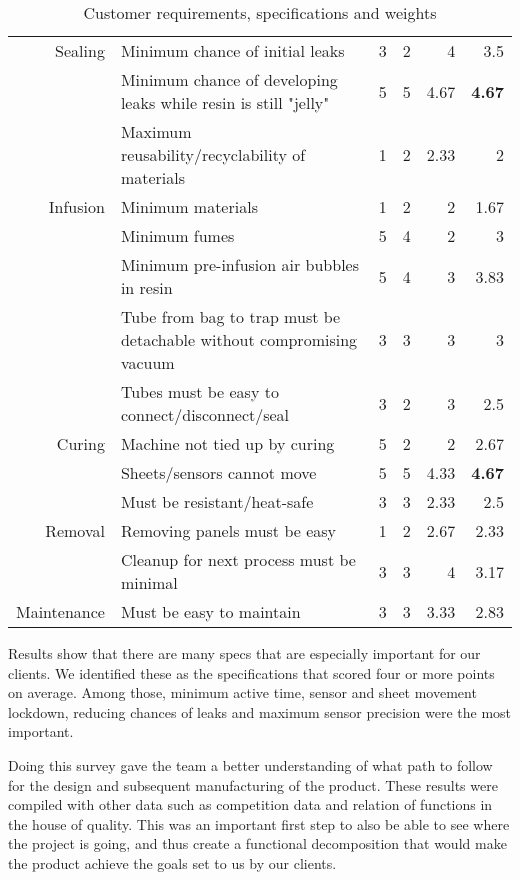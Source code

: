 \documentclass[12pt,letterpaper,notitlepage]{article}
\begin{document}
\begin{table}[H]
\begin{tabular}{rL{5cm}rrr|r}
\hline
    Sealing & Minimum chance of initial leaks & 3     & 2     & 4     & 3.5 \\
          & Minimum chance of developing leaks while resin is still "jelly" & 5     & 5     & 4.67  & \textbf{4.67} \\
          & Maximum reusability/recyclability of materials & 1     & 2     & 2.33  & 2 \\
\hline
    Infusion & Minimum materials & 1     & 2     & 2     & 1.67 \\
          & Minimum fumes & 5     & 4     & 2     & 3 \\
          & Minimum pre-infusion air bubbles in resin & 5     & 4     & 3     & 3.83 \\
          & Tube from bag to trap must be detachable without compromising vacuum & 3     & 3     & 3     & 3 \\
          & Tubes must be easy to connect/disconnect/seal & 3     & 2     & 3     & 2.5 \\
\hline
    Curing & Machine not tied up by curing & 5     & 2     & 2     & 2.67 \\
          & Sheets/sensors cannot move & 5     & 5     & 4.33  & \textbf{4.67} \\
          & Must be resistant/heat-safe & 3     & 3     & 2.33  & 2.5 \\
\hline
    Removal & Removing panels must be easy & 1     & 2     & 2.67  & 2.33 \\
          & Cleanup for next process must be minimal & 3     & 3     & 4     & 3.17 \\
\hline
    Maintenance & Must be easy to maintain & 3     & 3     & 3.33  & 2.83 \\
    \bottomrule
    \end{tabular}%
  \label{tab:customerSpecsWeights}%
  \caption{Customer requirements, specifications and weights}
\end{table}%
Results show that there are many specs that are especially important for our clients. We identified these as the specifications that scored four or more points on average. Among those, minimum active time, sensor and sheet movement lockdown, reducing chances of leaks and maximum sensor precision were the most important.

Doing this survey gave the team a better understanding of what path to follow for the design and subsequent manufacturing of the product. These results were compiled with other data such as competition data and relation of functions in the house of quality. This was an important first step to also be able to see where the project is going, and thus create a functional decomposition that would make the product achieve the goals set to us by our clients.
\end{document}
